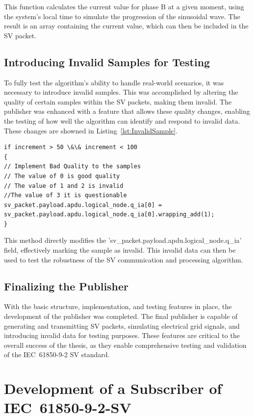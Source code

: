 This function calculates the current value for phase B at a given moment, using the system's local time to simulate the progression of the sinusoidal wave. The result is an array containing the current value, which can then be included in the SV packet.

\subsection{Introducing Invalid Samples for Testing}

To fully test the algorithm's ability to handle real-world scenarios, it was necessary to introduce invalid samples. This was accomplished by altering the quality of certain samples within the SV packets, making them invalid. The publisher was enhanced with a feature that allows these quality changes, enabling the testing of how well the algorithm can identify and respond to invalid data. These changes are showned in Listing~\ref{lst:InvalidSample}.

\begin{lstlisting}[breaklines=true, caption={Invalid sample.}, label={lst:InvalidSample}]
if increment > 50 \&\& increment < 100
{
// Implement Bad Quality to the samples
// The value of 0 is good quality
// The value of 1 and 2 is invalid
//The value of 3 it is questionable
sv_packet.payload.apdu.logical_node.q_ia[0] = sv_packet.payload.apdu.logical_node.q_ia[0].wrapping_add(1);	
}
\end{lstlisting}

This method directly modifies the 'sv\_packet.payload.apdu.logical\_node.q\_ia' field, effectively marking the sample as invalid. This invalid data can then be used to test the robustness of the SV communication and processing algorithm.

\subsection{Finalizing the Publisher}

With the basic structure, implementation, and testing features in place, the development of the publisher was completed. The final publisher is capable of generating and transmitting SV packets, simulating electrical grid signals, and introducing invalid data for testing purposes. These features are critical to the overall success of the thesis, as they enable comprehensive testing and validation of the IEC~61850-9-2 SV standard.

\section{Development of a Subscriber of IEC~61850-9-2-SV}

